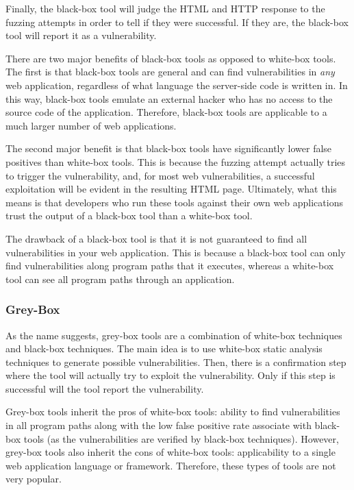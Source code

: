 Finally, the black-box tool will judge the HTML and HTTP response to
the fuzzing attempts in order to tell if they were successful. If they
are, the black-box tool will report it as a vulnerability. 

There are two major benefits of black-box tools as opposed to
white-box tools. The first is that black-box tools are general and can
find vulnerabilities in \emph{any} web application, regardless of what
language the server-side code is written in. In this way, black-box
tools emulate an external hacker who has no access to the source code
of the application. Therefore, black-box tools are applicable to a
much larger number of web applications. 

The second major benefit is that black-box tools have significantly
lower false positives than white-box tools. This is because the
fuzzing attempt actually tries to trigger the vulnerability, and, for
most web vulnerabilities, a successful exploitation will be evident in
the resulting HTML page. Ultimately, what this means is that
developers who run these tools against their own web applications
trust the output of a black-box tool than a white-box tool. 

The drawback of a black-box tool is that it is not guaranteed to find
all vulnerabilities in your web application. This is because a
black-box tool can only find vulnerabilities along program paths that
it executes, whereas a white-box tool can see all program paths
through an application. 

\subsubsection{Grey-Box}

As the name suggests, grey-box tools are a combination of white-box
techniques and black-box techniques. The main idea is to use white-box
static analysis techniques to generate possible vulnerabilities. Then,
there is a confirmation step where the tool will actually try to
exploit the vulnerability. Only if this step is successful will the
tool report the vulnerability.

Grey-box tools inherit the pros of white-box tools: ability to find
vulnerabilities in all program paths along with the low false positive
rate associate with black-box tools (as the vulnerabilities are
verified by black-box techniques). However, grey-box tools also
inherit the cons of white-box tools: applicability to a single web
application language or framework. Therefore, these types of tools are
not very popular.
\\

